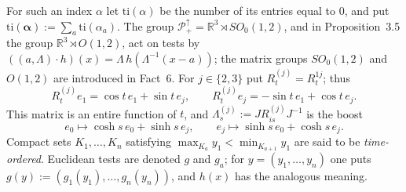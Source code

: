 \documentclass[11pt,letterpaper,reqno]{amsart}
\theoremstyle{definition}
\begin{document}
For such an index $\alpha$ let $\mathrm{ti}(\alpha)$ be the number of its entries equal to $0$, and put $\mathrm{ti}(\boldsymbol\alpha):=\sum_a\mathrm{ti}(\alpha_a)$.
The group $\mathcal P_+^\uparrow=\mathbb R^3\rtimes SO_0(1,2)$, and in Proposition~3.5 the group $\mathbb R^3\rtimes O(1,2)$, act on tests by $((a,\Lambda)\cdot h)(x)=\Lambda\,h(\Lambda^{-1}(x-a))$; the matrix groups $SO_0(1,2)$ and $O(1,2)$ are introduced in Fact~6.
For $j\in\{2,3\}$ put $R^{(j)}_t=R^{1j}_t$; thus
\begin{equation*}
R^{(j)}_te_1=\cos t\,e_1+\sin t\,e_j,\qquad R^{(j)}_te_j=-\sin t\,e_1+\cos t\,e_j.
\end{equation*}
This matrix is an entire function of $t$, and $\Lambda^{(j)}_s:=JR^{(j)}_{is}J^{-1}$ is the boost
\begin{equation*}
e_0\mapsto\cosh s\,e_0+\sinh s\,e_j,\qquad e_j\mapsto\sinh s\,e_0+\cosh s\,e_j.
\end{equation*}
Compact sets $K_1,\dots,K_n$ satisfying $\max_{K_a}y_1<\min_{K_{a+1}}y_1$ are said to be \emph{time-ordered}.
Euclidean tests are denoted $g$ and $g_a$; for $y=(y_1,\dots,y_n)$ one puts $g(y):=(g_1(y_1),\dots,g_n(y_n))$, and $h(x)$ has the analogous meaning.
\end{document}
